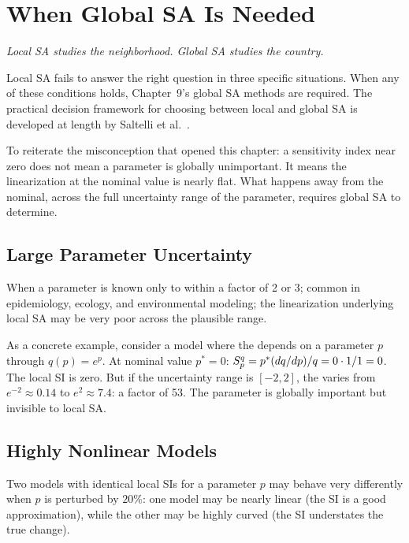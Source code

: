 \section{When Global SA Is Needed}
\label{sec:globalneeded}

\begin{flushright}
\textit{\small Local SA studies the neighborhood. Global SA studies the country.}
\end{flushright}

Local SA fails to answer the right question in three specific
situations. When any of these conditions holds, Chapter~9's global
SA methods are required. The practical decision framework for
choosing between local and global SA is developed at length by
Saltelli et al.~\cite{saltelli2004sensitivity,saltelli2006sensitivity}.

To reiterate the misconception that opened this chapter:
a sensitivity index near zero does not mean a parameter is globally
unimportant. It means the linearization at the nominal value is
nearly flat. What happens away from the nominal, across the
full uncertainty range of the parameter, requires global SA to determine.

\subsection{Large Parameter Uncertainty}

When a parameter is known only to within a factor of 2 or 3;
common in epidemiology, ecology, and environmental modeling;
the linearization underlying local SA may be very poor across
the plausible range.

As a concrete example, consider a model where the \QOI depends
on a parameter $p$ through $q(p) = e^p$. At nominal value $p^* = 0$:
$S_{p}^{q} = p^*(dq/dp)/q = 0 \cdot 1/1 = 0$. The local SI is zero.
But if the uncertainty range is $[-2, 2]$, the \QOI varies from
$e^{-2} \approx 0.14$ to $e^2 \approx 7.4$: a factor of 53.
The parameter is globally important but invisible to local SA.

\subsection{Highly Nonlinear Models}

Two models with identical local SIs for a parameter $p$ may
behave very differently when $p$ is perturbed by $20\%$:
one model may be nearly linear (the SI is a good approximation),
while the other may be highly curved (the SI understates the true change).

